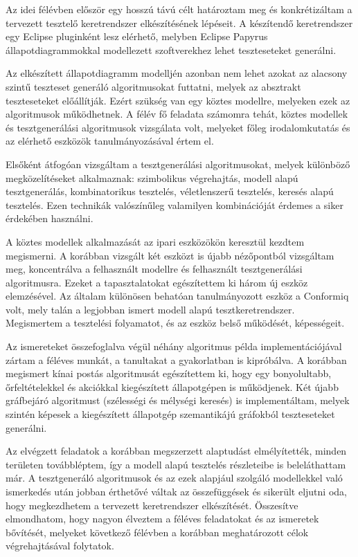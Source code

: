 \documentclass{article}
\begin{document}
Az idei félévben először egy hosszú távú célt határoztam meg és konkrétizáltam a tervezett tesztelő keretrendszer elkészítésének lépéseit. A készítendő keretrendszer egy Eclipse pluginként lesz elérhető, melyben Eclipse Papyrus állapotdiagrammokkal modellezett szoftverekhez lehet teszteseteket generálni.

Az elkészített állapotdiagramm modelljén azonban nem lehet azokat az alacsony szintű teszteset generáló algoritmusokat futtatni, melyek az absztrakt teszteseteket előállítják. Ezért szükség van egy köztes modellre, melyeken ezek az algoritmusok működhetnek. A félév fő feladata számomra tehát, köztes modellek és tesztgenerálási algoritmusok vizsgálata volt, melyeket főleg irodalomkutatás és az elérhető eszközök tanulmányozásával értem el.

Elsőként átfogóan vizsgáltam a tesztgenerálási algoritmusokat, melyek különböző megközelítéseket alkalmaznak: szimbolikus végrehajtás, modell alapú tesztgenerálás, kombinatorikus tesztelés, véletlenszerű tesztelés, keresés alapú tesztelés. Ezen technikák valószínűleg valamilyen kombinációját érdemes a siker érdekében használni.

A köztes modellek alkalmazását az ipari eszközökön keresztül kezdtem megismerni. A korábban vizsgált két eszközt is újabb nézőpontból vizsgáltam meg, koncentrálva a felhasznált modellre és felhasznált tesztgenerálási algoritmusra. Ezeket a tapasztalatokat egészítettem ki három új eszköz elemzésével. Az általam különösen behatóan tanulmányozott eszköz a Conformiq volt, mely talán a legjobban ismert modell alapú tesztkeretrendszer. Megismertem a tesztelési folyamatot, és az eszköz belső működését, képességeit.

Az ismereteket összefoglalva végül néhány algoritmus példa implementációjával zártam a féléves munkát, a tanultakat a gyakorlatban is kipróbálva. A korábban megismert kínai postás algoritmusát egészítettem ki, hogy egy bonyolultabb, őrfeltételekkel és akciókkal kiegészített állapotgépen is működjenek. Két újabb gráfbejáró algoritmust (szélességi és mélységi keresés) is implementáltam, melyek szintén képesek a kiegészített állapotgép szemantikájú gráfokból teszteseteket generálni.

Az elvégzett feladatok a korábban megszerzett alaptudást elmélyítették, minden területen továbbléptem, így a modell alapú tesztelés részleteibe is beleláthattam már. A tesztgeneráló algoritmusok és az ezek alapjául szolgáló modellekkel való ismerkedés után jobban érthetővé váltak az összefüggések és sikerült eljutni oda, hogy megkezdhetem a tervezett keretrendszer elkészítését. Összesítve elmondhatom, hogy nagyon élveztem a féléves feladatokat és az ismeretek bővítését, melyeket következő félévben a korábban meghatározott célok végrehajtásával folytatok.
\end{document}

